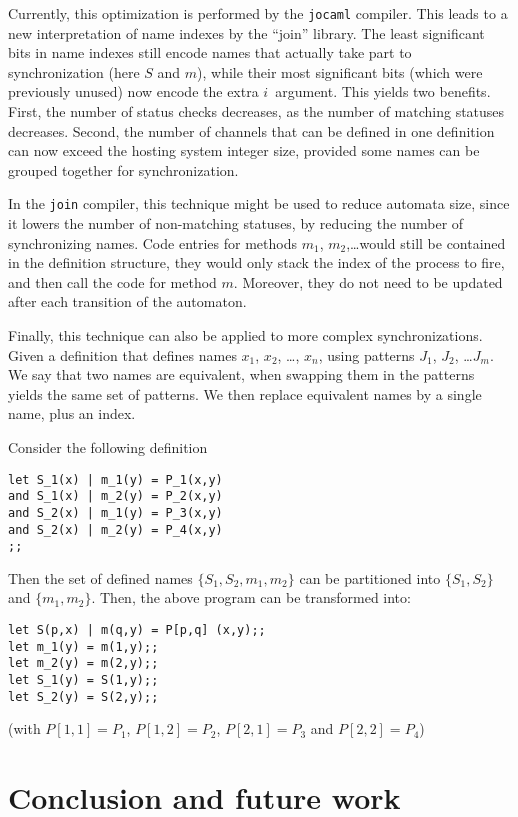 Currently, this optimization is performed by the {\tt jocaml}
compiler.  This leads to a new interpretation of name indexes by the
``join'' library.  The least significant bits in name indexes still
encode names that actually take part to synchronization (here $S$ and
$m$), while their most significant bits (which were previously unused)
now encode the extra $i$~argument.  This yields two benefits. First,
the number of status checks decreases, as the number of matching
statuses decreases.  Second, the number of channels that can be
defined in one definition can now exceed the hosting system integer
size, provided some names can be grouped together for synchronization.

In the {\tt join} compiler, this technique might be used to reduce
automata size, since it lowers the number of non-matching statuses, by
reducing the number of synchronizing names.  Code entries for methods
$m_1$, $m_2$,\ldots would still be contained in the definition
structure, they would only stack the index of the process to fire, and
then call the code for method $m$. Moreover, they do not need to be
updated after each transition of the automaton.


Finally, this technique can also be applied to more complex
synchronizations.  Given a definition that defines names $x_1$, $x_2$,
\ldots, $x_n$, using patterns $J_1$, $J_2$, \ldots $J_m$.  We say that
two names are equivalent, when swapping them in the patterns yields
the same set of patterns.  We then replace equivalent names by a
single name, plus an index.

Consider the following definition
\begin{verbatim}
let S_1(x) | m_1(y) = P_1(x,y)
and S_1(x) | m_2(y) = P_2(x,y)
and S_2(x) | m_1(y) = P_3(x,y)
and S_2(x) | m_2(y) = P_4(x,y)
;;
\end{verbatim}
Then the set of defined names $\{S_1, S_2, m_1, m_2\}$ can be
partitioned into $\{S_1, S_2\}$ and $\{m_1, m_2\}$.
Then, the above program can be transformed into:
\begin{verbatim}
let S(p,x) | m(q,y) = P[p,q] (x,y);;
let m_1(y) = m(1,y);;
let m_2(y) = m(2,y);;
let S_1(y) = S(1,y);;
let S_2(y) = S(2,y);;
\end{verbatim}
(with $P[1,1] = P_1$, $P[1,2] = P_2$, $P[2,1] = P_3$ and $P[2,2] = P_4$)


\section{Conclusion and future work}
\label{conclusion}

